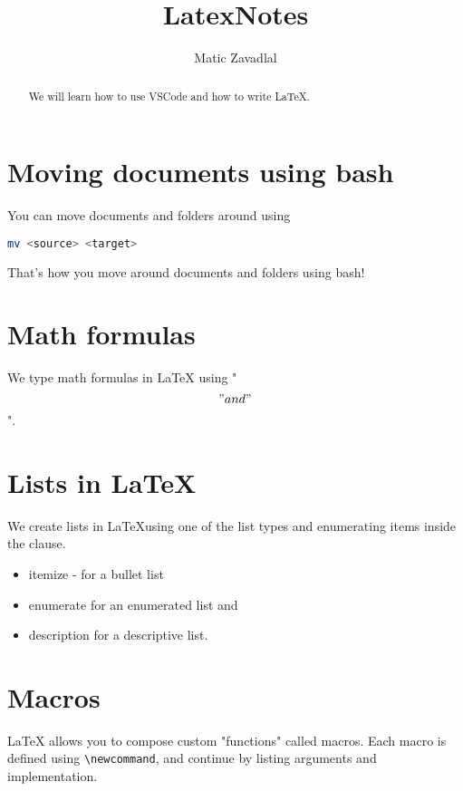 \documentclass[a4paper]{article}
\begin{document}
\title{LatexNotes}
\author{Matic Zavadlal}

\maketitle

\begin{abstract}
    We will learn how to use VSCode and how to write LaTeX.
\end{abstract}

\section{Moving documents using bash}

You can move documents and folders around using

\begin{lstlisting}[language=Bash]
    mv <source> <target>
\end{lstlisting}

That's how you move around documents and folders using bash! 

\section{Math formulas}

We type math formulas in \LaTeX{} using "\\\[" and "\\\]".

\section{Lists in LaTeX}

We create lists in \LaTeX using one of the list types and enumerating items inside the clause.

\begin{itemize}
    \item itemize - for a bullet list
    \item enumerate for an enumerated list and
    \item description for a descriptive list.
\end{itemize}

\section{Macros}

\LaTeX{} allows you to compose custom "functions" called macros.
Each macro is defined using \texttt{\textbackslash{}newcommand}, and continue by listing arguments and implementation.
\end{document}
